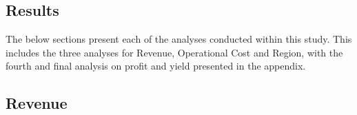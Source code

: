 \documentclass[review,12pt,authoryear]{elsarticle}
\begin{document}
\begin{linenumbers}

\section{Results}

The below sections present each of the analyses conducted within this study. This includes the three analyses for Revenue, Operational Cost and Region, with the fourth and final analysis on profit and yield presented in the appendix.

\subsection{Revenue}


\end{linenumbers}
\end{document}
